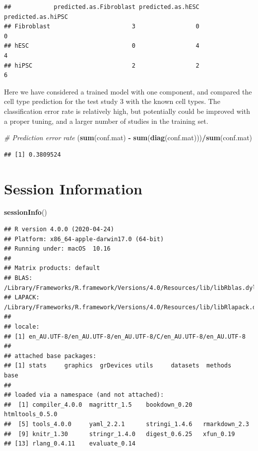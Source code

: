 \documentclass[]{book}
\newenvironment{Shaded}{\begin{snugshade}}{\end{snugshade}}
\newcommand{\KeywordTok}[1]{\textcolor[rgb]{0.13,0.29,0.53}{\textbf{#1}}}
\newcommand{\StringTok}[1]{\textcolor[rgb]{0.31,0.60,0.02}{#1}}
\newcommand{\CommentTok}[1]{\textcolor[rgb]{0.56,0.35,0.01}{\textit{#1}}}
\newcommand{\OperatorTok}[1]{\textcolor[rgb]{0.81,0.36,0.00}{\textbf{#1}}}
\newcommand{\NormalTok}[1]{#1}
\begin{document}
\begin{verbatim}
##            predicted.as.Fibroblast predicted.as.hESC predicted.as.hiPSC
## Fibroblast                       3                 0                  0
## hESC                             0                 4                  4
## hiPSC                            2                 2                  6
\end{verbatim}

Here we have considered a trained model with one component, and compared
the cell type prediction for the test study 3 with the known cell types.
The classification error rate is relatively high, but potentially could
be improved with a proper tuning, and a larger number of studies in the
training set.

\begin{Shaded}
\begin{Highlighting}[]
\CommentTok{# Prediction error rate}
\NormalTok{(}\KeywordTok{sum}\NormalTok{(conf.mat) }\OperatorTok{-}\StringTok{ }\KeywordTok{sum}\NormalTok{(}\KeywordTok{diag}\NormalTok{(conf.mat)))}\OperatorTok{/}\KeywordTok{sum}\NormalTok{(conf.mat)}
\end{Highlighting}
\end{Shaded}

\begin{verbatim}
## [1] 0.3809524
\end{verbatim}

\chapter{Session Information}\label{session-information}

\begin{Shaded}
\begin{Highlighting}[]
\KeywordTok{sessionInfo}\NormalTok{()}
\end{Highlighting}
\end{Shaded}

\begin{verbatim}
## R version 4.0.0 (2020-04-24)
## Platform: x86_64-apple-darwin17.0 (64-bit)
## Running under: macOS  10.16
## 
## Matrix products: default
## BLAS:   /Library/Frameworks/R.framework/Versions/4.0/Resources/lib/libRblas.dylib
## LAPACK: /Library/Frameworks/R.framework/Versions/4.0/Resources/lib/libRlapack.dylib
## 
## locale:
## [1] en_AU.UTF-8/en_AU.UTF-8/en_AU.UTF-8/C/en_AU.UTF-8/en_AU.UTF-8
## 
## attached base packages:
## [1] stats     graphics  grDevices utils     datasets  methods   base     
## 
## loaded via a namespace (and not attached):
##  [1] compiler_4.0.0  magrittr_1.5    bookdown_0.20   htmltools_0.5.0
##  [5] tools_4.0.0     yaml_2.2.1      stringi_1.4.6   rmarkdown_2.3  
##  [9] knitr_1.30      stringr_1.4.0   digest_0.6.25   xfun_0.19      
## [13] rlang_0.4.11    evaluate_0.14
\end{verbatim}


\end{document}
